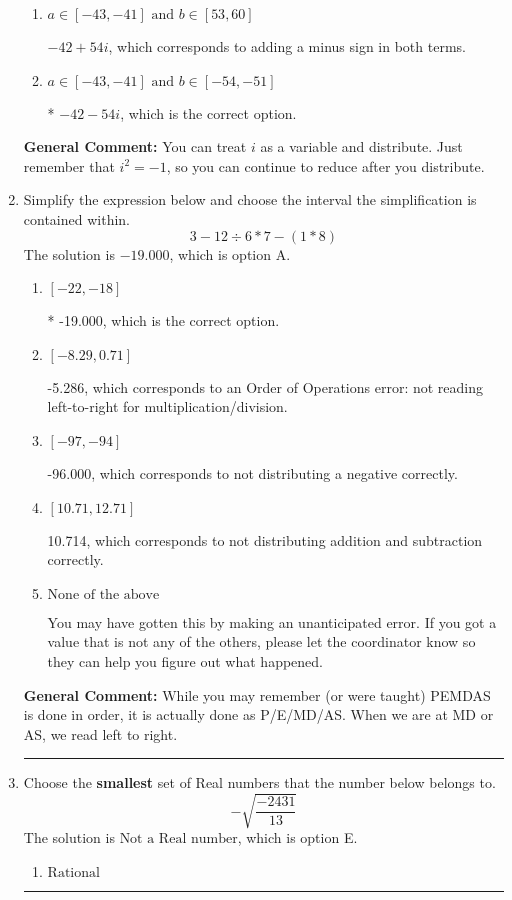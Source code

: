 \documentclass{extbook}[14pt]
\newcommand{\litem}[1]{\item #1

\rule{\textwidth}{0.4pt}}
\begin{document}
\begin{enumerate}
{\begin{enumerate}[label=\Alph*.]
 $18 - 66 i$, which corresponds to adding a minus sign in the second term.
\item \( a \in [-43, -41] \text{ and } b \in [53, 60] \)

 $-42 + 54 i$, which corresponds to adding a minus sign in both terms.
\item \( a \in [-43, -41] \text{ and } b \in [-54, -51] \)

* $-42 - 54 i$, which is the correct option.
\end{enumerate}

\textbf{General Comment:} You can treat $i$ as a variable and distribute. Just remember that $i^2=-1$, so you can continue to reduce after you distribute.
}
\litem{
Simplify the expression below and choose the interval the simplification is contained within.
\[ 3 - 12 \div 6 * 7 - (1 * 8) \]
The solution is \( -19.000 \), which is option A.\begin{enumerate}[label=\Alph*.]
\item \( [-22, -18] \)

* -19.000, which is the correct option.
\item \( [-8.29, 0.71] \)

 -5.286, which corresponds to an Order of Operations error: not reading left-to-right for multiplication/division.
\item \( [-97, -94] \)

 -96.000, which corresponds to not distributing a negative correctly.
\item \( [10.71, 12.71] \)

 10.714, which corresponds to not distributing addition and subtraction correctly.
\item \( \text{None of the above} \)

 You may have gotten this by making an unanticipated error. If you got a value that is not any of the others, please let the coordinator know so they can help you figure out what happened.
\end{enumerate}

\textbf{General Comment:} While you may remember (or were taught) PEMDAS is done in order, it is actually done as P/E/MD/AS. When we are at MD or AS, we read left to right.
}
\litem{
Choose the \textbf{smallest} set of Real numbers that the number below belongs to.
\[ -\sqrt{\frac{-2431}{13}} \]
The solution is \( \text{Not a Real number} \), which is option E.\begin{enumerate}[label=\Alph*.]
\item \( \text{Rational} \)


\end{enumerate}}
\end{enumerate}
\end{document}
